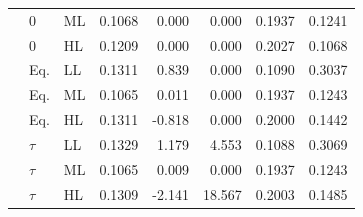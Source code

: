 \begin{table}[H]
\begin{tabular}{lllrrrrr}
 & 0 & ML & 0.1068 & 0.000 & 0.000 & 0.1937 & 0.1241 \\
 & 0 & HL & 0.1209 & 0.000 & 0.000 & 0.2027 & 0.1068 \\
 & Eq. & LL & 0.1311 & 0.839 & 0.000 & 0.1090 & 0.3037 \\
 & Eq. & ML & 0.1065 & 0.011 & 0.000 & 0.1937 & 0.1243 \\
 & Eq. & HL & 0.1311 & -0.818 & 0.000 & 0.2000 & 0.1442 \\
 & $\tau$ & LL & 0.1329 & 1.179 & 4.553 & 0.1088 & 0.3069 \\
 & $\tau$ & ML & 0.1065 & 0.009 & 0.000 & 0.1937 & 0.1243 \\
 & $\tau$ & HL & 0.1309 & -2.141 & 18.567 & 0.2003 & 0.1485 \\
\bottomrule
\end{tabular}
\end{table}
